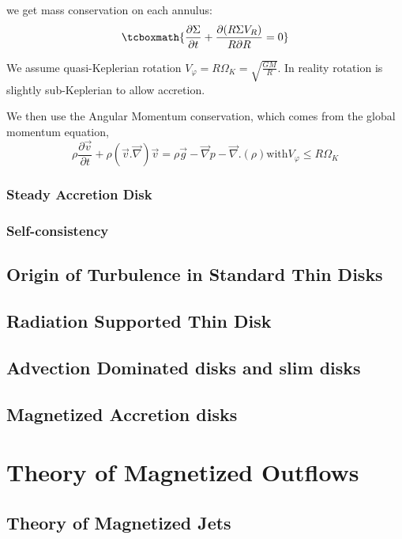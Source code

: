 \documentclass[10pt,a4paper,english,draft]{article}
\begin{document}
we get mass conservation on each annulus:
\begin{equation}
    \tcboxmath{
        \frac{\partial \Sigma}{\partial t} + \frac{\partial(R \Sigma V_R)}{R \partial R} = 0
    }
\end{equation}

We assume quasi-Keplerian rotation $V_\varphi = R \Omega_K = \sqrt{\frac{G
M}{R}}$. In reality rotation is slightly sub-Keplerian to allow accretion.

We then use the Angular Momentum conservation, which comes from the global
momentum equation,
\begin{equation*}
    \rho \frac{\partial \vec{v}}{\partial t} + \rho (\vec{v}.\vec{\nabla})\vec{v} = \rho \vec{g} - \vec{\nabla} p - \vec{\nabla}.(\rho ) \text{with} V_\varphi \leq R \Omega_K
\end{equation*}


\subsubsection{Steady Accretion Disk}
\subsubsection{Self-consistency}
\subsection{Origin of Turbulence in Standard Thin Disks}
\subsection{Radiation Supported Thin Disk}
\subsection{Advection Dominated disks and slim disks}
\subsection{Magnetized Accretion disks}

\section{Theory of Magnetized Outflows}
\subsection{Theory of Magnetized Jets}
\end{document}
